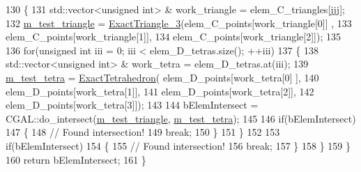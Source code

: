 \begin{DoxyCode}
130         \{
131             std::vector<unsigned int> & work\_triangle = elem\_C\_triangles[jjj];
132             \hyperlink{classcarl_1_1_intersection___tools_a4331121a50baaa93e499f6cfb446c1b0}{m\_test\_triangle} = \hyperlink{_c_g_a_l__typedefs_8h_acb9586e4ea704b6a4c4502ad0cb03c62}{ExactTriangle\_3}(elem\_C\_points[work\_triangle[0]]
      ,
133                     elem\_C\_points[work\_triangle[1]],
134                     elem\_C\_points[work\_triangle[2]]);
135 
136             \textcolor{keywordflow}{for}(\textcolor{keywordtype}{unsigned} \textcolor{keywordtype}{int} iii = 0; iii < elem\_D\_tetras.size(); ++iii)
137             \{
138                 std::vector<unsigned int> & work\_tetra = elem\_D\_tetras.at(iii);
139                 \hyperlink{classcarl_1_1_intersection___tools_a69657597ebb9655f8797b289939835a3}{m\_test\_tetra} = \hyperlink{_c_g_a_l__typedefs_8h_a02a72c8dcf4a17c7460e7e71301d2d3f}{ExactTetrahedron}(    elem\_D\_points[work\_tetra[0]
      ],
140                         elem\_D\_points[work\_tetra[1]],
141                         elem\_D\_points[work\_tetra[2]],
142                         elem\_D\_points[work\_tetra[3]]);
143 
144                 bElemIntersect = CGAL::do\_intersect(\hyperlink{classcarl_1_1_intersection___tools_a4331121a50baaa93e499f6cfb446c1b0}{m\_test\_triangle},
      \hyperlink{classcarl_1_1_intersection___tools_a69657597ebb9655f8797b289939835a3}{m\_test\_tetra});
145 
146                 \textcolor{keywordflow}{if}(bElemIntersect)
147                 \{
148                     \textcolor{comment}{// Found intersection!}
149                     \textcolor{keywordflow}{break};
150                 \}
151             \}
152 
153             \textcolor{keywordflow}{if}(bElemIntersect)
154             \{
155                 \textcolor{comment}{// Found intersection!}
156                 \textcolor{keywordflow}{break};
157             \}
158         \}
159     \}
160     \textcolor{keywordflow}{return} bElemIntersect;
161 \}
\end{DoxyCode}
\hypertarget{classcarl_1_1_intersection___tools_a8238069bd83ef1029c6a5b60a188763b}{}
